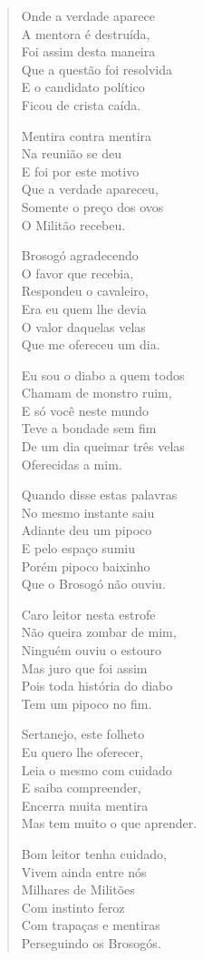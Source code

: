 \begin{verse}
Onde a verdade aparece\\
A mentora é destruída,\\ %
Foi assim desta maneira\\
Que a questão foi resolvida\\
E o candidato político\\
Ficou de crista caída.

Mentira contra mentira\\
Na reunião se deu\\
E foi por este motivo\\
Que a verdade apareceu,\\
Somente o preço dos ovos\\
O Militão recebeu.

Brosogó agradecendo\\
O favor que recebia,\\
Respondeu o cavaleiro,\\
Era eu quem lhe devia\\
O valor daquelas velas\\
Que me ofereceu um dia.

Eu sou o diabo a quem todos\\
Chamam de monstro ruim,\\
E só você neste mundo\\
Teve a bondade sem fim\\
De um dia queimar três velas\\
Oferecidas a mim.

Quando disse estas palavras\\
No mesmo instante saiu\\
Adiante deu um pipoco\\
E pelo espaço sumiu\\
Porém pipoco baixinho\\
Que o Brosogó não ouviu.

Caro leitor nesta estrofe\\
Não queira zombar de mim,\\
Ninguém ouviu o estouro\\
Mas juro que foi assim\\
Pois toda história do diabo\\
Tem um pipoco no fim.

Sertanejo, este folheto\\
Eu quero lhe oferecer,\\
Leia o mesmo com cuidado\\
E saiba compreender,\\
Encerra muita mentira\\
Mas tem muito o que aprender.

Bom leitor tenha cuidado,\\
Vivem ainda entre nós\\
Milhares de Militões\\
Com instinto feroz\\
Com trapaças e mentiras\\
Perseguindo os Brosogós.
\end{verse}

